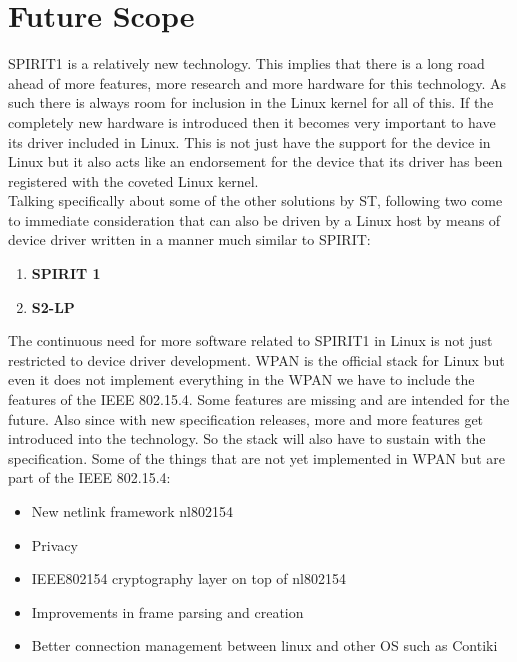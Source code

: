 \section{Future Scope}
SPIRIT1 is a relatively new technology. This implies that there is a long road ahead of more features, more research and more hardware for this technology. As such there is always room for inclusion in the Linux kernel for all of this. If the completely new hardware is introduced then it becomes very important to have its driver included in Linux. This is not just have the support for the device in Linux but it also acts like an endorsement for the device that its driver has been registered with the coveted Linux kernel.\\
Talking specifically about some of the other solutions by ST, following two come to immediate consideration that can also be driven by a Linux host by means of device driver written in a manner much similar to SPIRIT:
\begin{enumerate}
	\item \textbf{SPIRIT 1}
	\item \textbf{S2-LP}
\end{enumerate}
The continuous need for more software related to SPIRIT1 in Linux is not just restricted to device driver development. WPAN is the official stack for Linux but even it does not implement everything in the WPAN we have to include the features of the IEEE 802.15.4. Some features are missing and are intended for the future. Also since with new specification releases, more and more features get introduced into the technology. So the stack will also have to sustain with the specification. Some of the things that are not yet implemented in WPAN but are part of the IEEE 802.15.4:
\begin{itemize}
	\item New netlink framework nl802154 
	\item Privacy
	\item IEEE802154 cryptography layer on top of nl802154
	\item Improvements in frame parsing and creation
	\item Better connection management between linux and other OS such as Contiki
\end{itemize}
